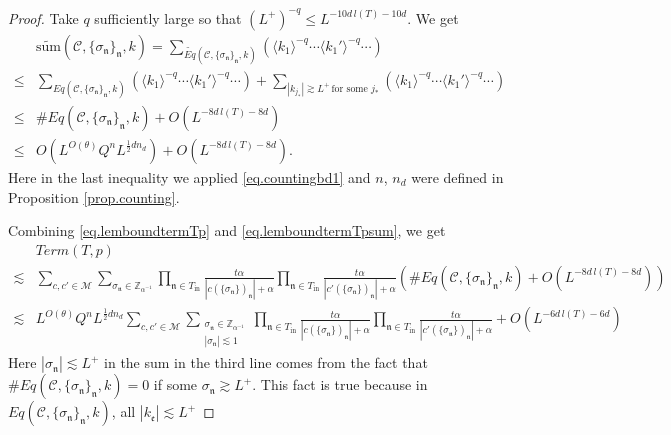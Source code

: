 \begin{proof}
Take $q$ sufficiently large so that $(L^+)^{-q}\le L^{-10d\, l(T)-10d}$. We get
\begin{equation}\label{eq.lemboundtermTpsum}
\begin{split}
    &\widetilde{\text{sum}}(\mathcal{C}, \{\sigma_{\mathfrak{n}}\}_{\mathfrak{n}},k)=\sum_{\widetilde{Eq}(\mathcal{C}, \{\sigma_{\mathfrak{n}}\}_{\mathfrak{n}},k)}\left(\langle k_1\rangle^{-q}\cdots\langle k_1'\rangle^{-q}\cdots\right)
    \\
    \le & \sum_{Eq(\mathcal{C}, \{\sigma_{\mathfrak{n}}\}_{\mathfrak{n}},k)}\left(\langle k_1\rangle^{-q}\cdots\langle k_1'\rangle^{-q}\cdots\right)+\sum_{|k_{j_*}|\gtrsim L^+\, \text{for some }j_*}
    \left(\langle k_1\rangle^{-q}\cdots\langle k_1'\rangle^{-q}\cdots\right)
    \\
    \le &\#Eq(\mathcal{C}, \{\sigma_{\mathfrak{n}}\}_{\mathfrak{n}},k)+O(L^{-8d\, l(T)-8d})
    \\
    \le &O(L^{O(\theta)} Q^{n} L^{\frac{1}{2} dn_d})+O(L^{-8d\, l(T)-8d}).
\end{split}
\end{equation}
Here in the last inequality we applied \eqref{eq.countingbd1} and $n$, $n_d$ were defined in Proposition \ref{prop.counting}.

Combining \eqref{eq.lemboundtermTp} and \eqref{eq.lemboundtermTpsum}, we get
\begin{equation}
\begin{split}
    &Term(T, p)
    \\
    \lesssim&\sum_{c,c'\in \mathscr{M} } \sum_{\sigma_{\mathfrak{n}}\in \mathbb{Z}_{\alpha^{-1}}} \prod_{\mathfrak{n}\in T_{\text{in}}}\frac{t\alpha}{|c(\{\sigma_{\mathfrak{n}}\})_{\mathfrak{n}}|+\alpha} \prod_{\mathfrak{n}\in T_{\text{in}}}\frac{t\alpha}{|c'(\{\sigma_{\mathfrak{n}}\})_{\mathfrak{n}}|+\alpha} (\#Eq(\mathcal{C}, \{\sigma_{\mathfrak{n}}\}_{\mathfrak{n}},k)+O(L^{-8d\, l(T)-8d}))
    \\
    \lesssim & L^{O(\theta)} Q^{n} L^{\frac{1}{2} dn_d}\sum_{c,c'\in \mathscr{M} } \sum_{\substack{\sigma_{\mathfrak{n}}\in \mathbb{Z}_{\alpha^{-1}}\\ |\sigma_{\mathfrak{n}}|\lesssim 1}} \prod_{\mathfrak{n}\in T_{\text{in}}}\frac{t\alpha}{|c(\{\sigma_{\mathfrak{n}}\})_{\mathfrak{n}}|+\alpha} \prod_{\mathfrak{n}\in T_{\text{in}}}\frac{t\alpha}{|c'(\{\sigma_{\mathfrak{n}}\})_{\mathfrak{n}}|+\alpha}  + O(L^{-6d\, l(T)-6d})
\end{split}
\end{equation}
Here $|\sigma_{\mathfrak{n}}|\lesssim L^+$ in the sum in the third line comes from the fact that $\#Eq(\mathcal{C}, \{\sigma_{\mathfrak{n}}\}_{\mathfrak{n}},k)=0$ if some $\sigma_{\mathfrak{n}}\gtrsim L^+$. This fact is true because in $Eq(\mathcal{C}, \{\sigma_{\mathfrak{n}}\}_{\mathfrak{n}},k)$, all $|k_{\mathfrak{e}}|\lesssim L^+$


\end{proof}
